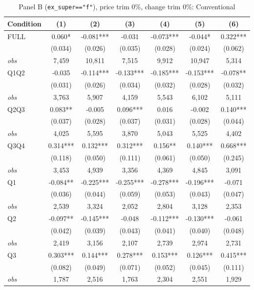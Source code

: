 \documentclass[11pt]{article}
\begin{document}
\begin{table}[!htbp]
\centering
\caption{Panel B (\texttt{ex\_super=="f"}), price trim 0\%, change trim 0\%: Conventional}
\label{tab:b:trim00:conventional}
\small
\begin{tabular}{lcccccc}
\toprule
Condition & (1) & (2) & (3) & (4) & (5) & (6) \\
\midrule
FULL & 0.060* & -0.081*** & -0.031 & -0.073*** & -0.044* & 0.322*** \\
 & (0.034) & (0.026) & (0.035) & (0.028) & (0.024) & (0.062) \\
\textit{obs} &  7,459 & 10,811 &  7,515 &  9,912 & 10,947 &  5,314 \\
Q1Q2 & -0.035 & -0.114*** & -0.133*** & -0.185*** & -0.153*** & -0.078** \\
 & (0.031) & (0.026) & (0.034) & (0.032) & (0.028) & (0.032) \\
\textit{obs} & 3,763 & 5,907 & 4,159 & 5,543 & 6,102 & 5,111 \\
Q2Q3 & 0.083** & -0.005 & 0.096*** & 0.016 & -0.002 & 0.140*** \\
 & (0.037) & (0.028) & (0.037) & (0.031) & (0.028) & (0.044) \\
\textit{obs} & 4,025 & 5,595 & 3,870 & 5,043 & 5,525 & 4,402 \\
Q3Q4 & 0.314*** & 0.132*** & 0.312*** & 0.156** & 0.140*** & 0.668*** \\
 & (0.118) & (0.050) & (0.111) & (0.061) & (0.050) & (0.245) \\
\textit{obs} & 3,453 & 4,939 & 3,356 & 4,369 & 4,845 & 3,091 \\
Q1 & -0.084** & -0.225*** & -0.255*** & -0.278*** & -0.196*** & -0.071 \\
 & (0.036) & (0.044) & (0.059) & (0.053) & (0.043) & (0.047) \\
\textit{obs} & 2,539 & 3,324 & 2,052 & 2,804 & 3,128 & 2,353 \\
Q2 & -0.097** & -0.145*** & -0.048 & -0.112*** & -0.130*** & -0.061 \\
 & (0.042) & (0.039) & (0.043) & (0.041) & (0.040) & (0.048) \\
\textit{obs} & 2,419 & 3,156 & 2,107 & 2,739 & 2,974 & 2,731 \\
Q3 & 0.303*** & 0.144*** & 0.278*** & 0.153*** & 0.126*** & 0.415*** \\
 & (0.082) & (0.049) & (0.071) & (0.052) & (0.045) & (0.111) \\
\textit{obs} & 1,787 & 2,516 & 1,763 & 2,304 & 2,551 & 1,929 \\

\end{tabular}
\end{table}
\end{document}

